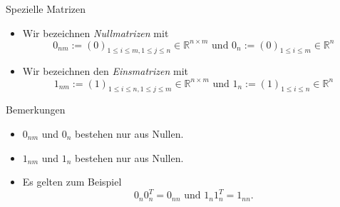 \documentclass[
  8pt,
  ignorenonframetext,
]{beamer}
\providecommand{\tightlist}{%
  \setlength{\itemsep}{0pt}\setlength{\parskip}{0pt}}
\begin{document}
\begin{frame}{Spezielle Matrizen}
\protect\hypertarget{spezielle-matrizen-1}{}
\footnotesize
\begin{definition}
\begin{itemize}
\item Wir bezeichnen \textit{Nullmatrizen} mit
\begin{equation}
0_{nm} := (0)_{1 \le i \le m, 1 \le j \le n} \in \mathbb{R}^{n \times m}
\mbox{ und }
0_{n} := (0)_{1 \le i \le m} \in \mathbb{R}^{n}
\end{equation}
\item Wir bezeichnen den \textit{Einsmatrizen} mit
\begin{equation}
1_{nm} := (1)_{1 \le i \le n, 1 \le j \le m} \in \mathbb{R}^{n \times m}
\mbox{ und }
1_n := (1)_{1 \le i \le n} \in \mathbb{R}^n
\end{equation}
\end{itemize}
\end{definition}

Bemerkungen

\begin{itemize}
\tightlist
\item
  \(0_{nm}\) und \(0_{n}\) bestehen nur aus Nullen.
\item
  \(1_{nm}\) und \(1_{n}\) bestehen nur aus Nullen.
\item
  Es gelten zum Beispiel \begin{equation}
  0_n0_n^T = 0_{nn} \mbox{ und } 1_n1_n^T = 1_{nn}.
  \end{equation}
\end{itemize}
\end{frame}
\end{document}
